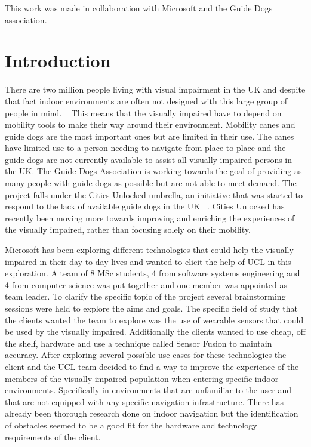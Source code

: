\documentclass[prodmode,acmtosem]{acmsmall} %
\begin{document}


\begin{bottomstuff}
This work was made in collaboration with Microsoft and the Guide Dogs association.
\end{bottomstuff}

\maketitle

\section{Introduction}
There are two million people living with visual impairment in the UK and despite that fact indoor environments are often not designed with this large group of people in mind. ~\cite{NHSBlindStatistics} This means that the visually impaired have to depend on mobility tools to make their way around their environment. Mobility canes and guide dogs are the most important ones but are limited in their use. The canes have limited use to a person needing to navigate from place to place and the guide dogs are not currently available to assist all visually impaired persons in the UK. The Guide Dogs Association is working towards the goal of providing as many people with guide dogs as possible but are not able to meet demand. The project falls under the Cities Unlocked umbrella, an initiative that was started to respond to the lack of available guide dogs in the UK ~\cite{CitiesUnlockedGeneral}. Cities Unlocked has recently been moving more towards improving and enriching the experiences of the visually impaired, rather than focusing solely on their mobility.

Microsoft has been exploring different technologies that could help the visually impaired in their day to day lives and wanted to elicit the help of UCL in this exploration. A team of 8 MSc students, 4 from software systems engineering and 4 from computer science was put together and one member was appointed as team leader. To clarify the specific topic of the project several brainstorming sessions were held to explore the aims and goals. The specific field of study that the clients wanted the team to explore was the use of wearable sensors that could be used by the visually impaired. Additionally the clients wanted to use cheap, off the shelf, hardware and use a technique called Sensor Fusion to maintain accuracy.
After exploring several possible use cases for these technologies the client and the UCL team decided to find a way to improve the experience of the members of the visually impaired population when entering specific indoor environments.
Specifically in environments that are unfamiliar to the user and that are not equipped with any specific navigation infrastructure. There has already been thorough research done on indoor navigation but the identification of obstacles seemed to be a good fit for the hardware and technology requirements of the client.
\end{document}
